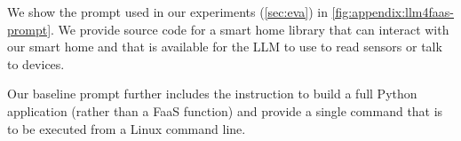 We show the prompt used in our experiments (\cref{sec:eva}) in \cref{fig:appendix:llm4faas-prompt}.
We provide source code for a smart home library that can interact with our smart home and that is available for the LLM to use to read sensors or talk to devices.

Our baseline prompt further includes the instruction to build a full Python application (rather than a FaaS function) and provide a single command that is to be executed from a Linux command line.
